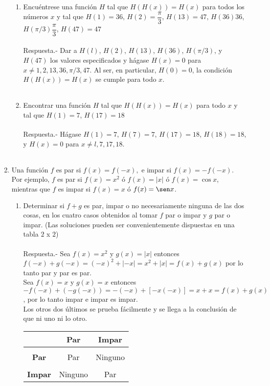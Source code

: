 \begin{enumerate}
\begin{enumerate}[\bfseries (a)]
	    \item Encuéntrese una función $H$ tal que $H(H(x))=H(x)$ para todos los números $x$ y tal que $H(1)=36$, $H(2)=\dfrac{\pi}{3}$, $H(13)=47$, $H(36)36$, $H(\pi / 3)\dfrac{\pi}{3}$, $H(47)=47$\\\\
	    Respuesta.-\; Dar a $H(l)$, $H(2)$, $H(13)$, $H(36)$, $H(\pi /3)$, y $H(47)$ los valores especificados y hágase $H(x) = 0$ para $x \neq 1, 2, 13, 36, \pi /3, 47.$ Al ser, en particular, $H(0) = 0$, la condición $H(H(x)) = H(x)$ se cumple para todo $x$.\\\\

	    \item Encontrar una función $H$ tal que $H(H(x))=H(x)$ para todo $x$ y tal que $H(1)=7$, $H(17)=18$\\\\
	    Respuesta.-\; Hágase $H(1) = 7$, $H(7) = 7$, $H(17) = 18$, $H(18) = 18$, y $H(x) = 0$ para $x \neq l , 7, 17, 18$.\\\\

	\end{enumerate}

	\item Una función $f$ es par si $f(x)=f(-x),$ e impar si $f(x)=-f(-x)$. Por ejemplo, $f$ es par si $f(x)=x^2$ ó $f(x)=|x|$ ó $f(x)=\cos x$, mientras que $f$ es impar si $f(x)=x$ ó $f(x)=\sen x$.

	\begin{enumerate}[\bfseries (a)]

	    \item Determinar si $f+g$ es par, impar o no necesariamente ninguna de las dos cosas, en los cuatro casos obtenidos al tomar $f$ par o impar y $g$ par o impar. (Las soluciones pueden ser convenientemente dispuestas en una tabla $2$ x $2$)\\\\
	    Respuesta.-\; Sea $f(x)=x^2$ y $g(x)=|x|$ entonces $f(-x)+g(-x)=(-x)^2 + |-x| = x^2 + |x| = f(x) + g(x)$ por lo tanto par y par es par.\\
	    Sea $f(x) = x$ y $g(x)=x$ entonces $-f(-x) + (-g(-x)) = -(-x) + [-x(-x)] = x + x = f(x) + g(x)$, por lo tanto impar e impar es impar.\\
	    Los otros dos últimos se prueba fácilmente y se llega a la conclusión de que ni uno ni lo otro.
	    \begin{center}
		\begin{tabular}{c|cc}
		    &\textbf{Par}&\textbf{Impar}\\
		    \hline\\
		    \textbf{Par}&Par&Ninguno\\\\
		    \textbf{Impar}&Ninguno&Par\\
		\end{tabular}
	    \end{center}
	    \vspace{1cm}


\end{enumerate}
\end{enumerate}
